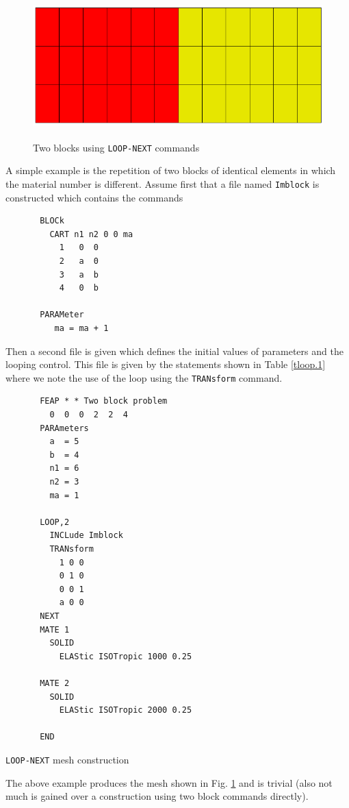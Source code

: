 \begin{figure}[hb!]
\centerline {\hfil \includegraphics[height=2.2in]{figs/lp2blk} \hfil}
\caption{Two blocks using \texttt{LOOP-NEXT} commands \label{floop.0}}
\end{figure}
A simple example is the repetition of two blocks of identical elements
in which the material number is different.  Assume first that a file
named \texttt{Imblock} is constructed which contains the commands
\begin{verbatim}
       BLOCk
         CART n1 n2 0 0 ma
           1   0  0
           2   a  0
           3   a  b
           4   0  b

       PARAMeter
          ma = ma + 1

\end{verbatim}
Then a second file is given which defines the initial values of parameters
and the looping control.  This file is given by the statements shown in
Table \ref{tloop.1}
where we note the use of the loop using the \texttt{TRANsform} command. 
\begin{table}[ht!]
\begin{center}
\begin{verbatim}
       FEAP * * Two block problem
         0  0  0  2  2  4
       PARAmeters
         a  = 5
         b  = 4
         n1 = 6
         n2 = 3
         ma = 1
 
       LOOP,2
         INCLude Imblock
         TRANsform
           1 0 0
           0 1 0
           0 0 1
           a 0 0
       NEXT
       MATE 1
         SOLID
           ELAStic ISOTropic 1000 0.25

       MATE 2
         SOLID
           ELAStic ISOTropic 2000 0.25

       END
\end{verbatim}
\caption{\texttt{LOOP-NEXT} mesh construction \label{tloop.1}}
\end{center}
\end{table}
The above example produces the mesh shown in Fig. \ref{floop.0} and
is trivial (also not much is gained over a construction
using two block commands directly).

